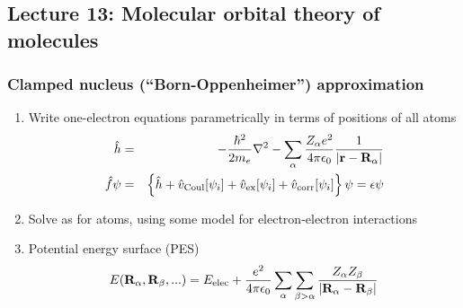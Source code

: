 \documentclass[11pt]{article}
\begin{document}
\subsection{Lecture 13: Molecular orbital theory of molecules}
\label{sec:orgfb35283}
\subsubsection{Clamped nucleus (``Born-Oppenheimer'') approximation}
\label{sec:orge4f9011}
\begin{enumerate}
\item Write one-electron equations parametrically in terms of positions of  all atoms
\begin{eqnarray}
\hat h & = & -\frac{\hbar^2}{2m_e}\nabla^2-\sum_\alpha \frac{Z_\alpha
    e^2}{4\pi\epsilon_0}\frac{1}{|{\bf r}-{\bf R}_\alpha|} \\
\hat f\psi & = & \left\{\hat h + \hat v_\mathrm{Coul}[\psi_i] + \hat
      v_\mathrm{ex}[\psi_i]+\hat v_\mathrm{corr}[\psi_i] \right\}\psi=\epsilon\psi
\end{eqnarray}
\item Solve as for atoms, using some model for electron-electron interactions
\item Potential energy surface (PES)
\[ E({\bf R}_\alpha, {\bf
            R}_\beta,...)=E_\mathrm{elec}+\frac{e^2}{4\pi\epsilon_0}\sum_\alpha\sum_{\beta>\alpha}\frac{Z_\alpha
            Z_\beta}{|{\bf R}_\alpha-{\bf R}_\beta|} \]
\end{enumerate}
\end{document}
